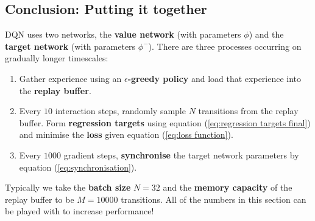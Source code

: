 \documentclass[]{article}
\begin{document}
\subsection*{Conclusion: Putting it together}

DQN uses two networks, the \textbf{value network} (with parameters $\phi$) and the \textbf{target network} (with parameters $\phi^-$). There are three processes occurring on gradually longer timescales:

\begin{enumerate}
	\item Gather experience using an \textbf{$\epsilon$-greedy policy} and load that experience into the \textbf{replay buffer}. 
	\item Every $10$ interaction steps, randomly sample $N$ transitions from the replay buffer. Form \textbf{regression targets} using equation (\ref{eq:regression targets final}) and minimise the \textbf{loss} given equation (\ref{eq:loss function}). 
	\item Every $1000$ gradient steps, \textbf{synchronise} the target network parameters by equation (\ref{eq:synchronisation}).
\end{enumerate}
Typically we take the \textbf{batch size} $N = 32$ and the \textbf{memory capacity} of the replay buffer to be $M = 10000$ transitions. All of the numbers in this section can be played with to increase performance!
\end{document}
